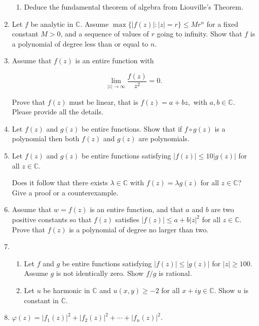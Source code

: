 \documentclass[a4paper,10pt]{article}
\begin{document}
\begin{enumerate}
		\begin{enumerate}
			\item Deduce the fundamental theorem of algebra from Liouville's Theorem.
		\end{enumerate}

		
		\item Let $f$ be analytic in $\mathbb{C}$. Assume $\max\{|f(z)|:|z|=r\}\le Mr^{n}$ for a fixed constant $M>0$,
		and a sequence of values of $r$ going to infinity.
		Show that $f$ is a polynomial of degree less than or equal to $n$.
		
		\item Assume that $f(z)$ is an entire function with
		
		\[\lim_{|z|\rightarrow\infty}\frac{f(z)}{z^{2}}=0.\]
		
		Prove that $f(z)$ must be linear, that is $f(z)=a+bz,$ with $a, b\in \mathbb{C}$. Please provide all the details.
		
		\item Let $f(z)$ and $g(z)$ be entire functions. Show that if $f\circ g(z)$ is a polynomial then both $f(z)$ and $g(z)$ are polynomials.
		
		\item Let $f(z)$ and $g(z)$ be entire functions satisfying $|f(z)|\le 10|g(z)|$ for all $z\in\mathbb{C}$.
		
		Does it follow that there exists $\lambda\in\mathbb{C}$ with $f(z)=\lambda g(z)$ for all $z\in\mathbb{C}$?
		Give a proof or a counterexample.
		
		\item Assume that $w=f(z)$ is an entire function, and that $a$ and $b$ are two positive constants so that $f(z)$ satisfies $|f(z)|\le a+b|z|^{2}$ for all $z\in \mathbb{C}$. Prove that $f(z)$ is a polynomial of degree no larger than two.
		
		\item 
		
		\begin{enumerate}
			\item Let $f$ and $g$ be entire functions satisfying $|f(z)|\le|g(z)|$ for $|z|\ge100$. Assume $g$ is not identically zero.
		Show $f/g$ is rational.
		
		\item Let $u$ be harmonic in $\mathbb{C}$ and $u(x,y)\ge-2$ for all $x+iy\in \mathbb{C}$. Show $u$ is constant in $\mathbb{C}$.
		\end{enumerate}
		
		\item $\varphi(z)=|f_{1}(z)|^{2}+|f_{2}(z)|^{2}+\cdots+|f_{n}(z)|^{2}$.
		

\end{enumerate}
\end{document}
